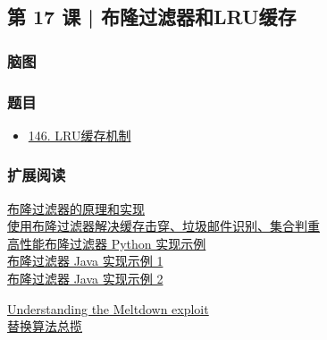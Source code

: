 \subsection{第 17 课 | 布隆过滤器和LRU缓存}

\subsubsection{脑图}

\subsubsection{题目}

\begin{itemize}
  \item \hyperref[leetcode:146]{146. LRU缓存机制}
\end{itemize}

\subsubsection{扩展阅读}

\href{https://www.cnblogs.com/cpselvis/p/6265825.html}{布隆过滤器的原理和实现} \\
\href{https://blog.csdn.net/tianyaleixiaowu/article/details/74721877}{使用布隆过滤器解决缓存击穿、垃圾邮件识别、集合判重} \\
\href{https://github.com/jhgg/pybloof}{高性能布隆过滤器 Python 实现示例} \\
\href{https://github.com/lovasoa/bloomfilter/blob/master/src/main/java/BloomFilter.java}{布隆过滤器 Java 实现示例 1} \\
\href{https://github.com/Baqend/Orestes-Bloomfilter}{布隆过滤器 Java 实现示例 2}

\href{https://www.sqlpassion.at/archive/2018/01/06/understanding-the-meltdown-exploit-in-my-own-simple-words/}{Understanding the Meltdown exploit} \\
\href{https://en.wikipedia.org/wiki/Cache_replacement_policies}{替换算法总揽} \\

